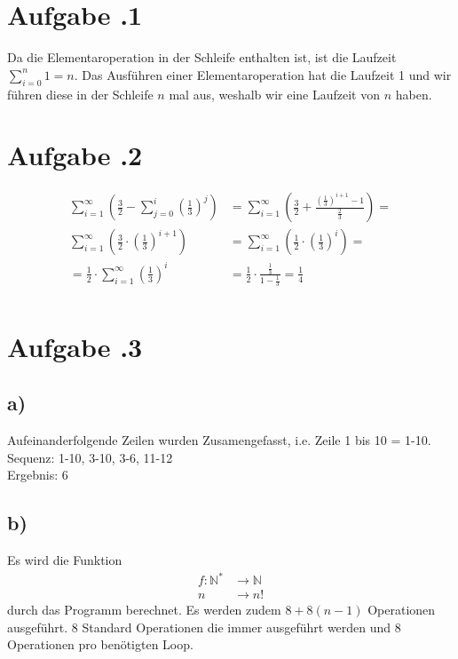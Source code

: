 \documentclass[12pt,german,a4paper]{article}
\author{Giovanni Ngodji Djeuha, Mike Lenz, Jonas Tesfamariam,\\ Bastian Schmitt, Luca Winterkamp}
\begin{document}
	\maketitle

	\section*{Aufgabe \bn.1}
	
	Da die Elementaroperation in der Schleife enthalten ist, ist die Laufzeit $ \sum ^{ n } _{ i=0 } 1=n $. Das Ausführen einer Elementaroperation hat die Laufzeit 1 und wir führen diese in der Schleife $n$ mal aus, weshalb wir eine Laufzeit von $n$ haben.
	\newpage

	\section*{Aufgabe \bn.2}
	\begin{align*}
	\sum ^{ \infty } _{ i=1 } \left( \frac{ 3 }{ 2 } - \sum ^{ i } _{ j=0 }\left(\frac{ 1 }{ 3 } \right) ^{ j } \right) &= \sum ^{ \infty } _{ i=1 } \left( \frac{ 3 }{ 2 } + \frac{ (\frac{ 1 }{ 3 }) ^{ i+1 } -1  }{ \frac{ 2 }{ 3 }  }  \right) = \\
  \sum ^{ \infty } _{ i=1 } \left( \frac{ 3 }{ 2 } \cdot \left( \frac{ 1 }{ 3 } \right)^{ i+1 }  \right) &= \sum ^{ \infty } _{ i=1 } \left( \frac{ 1 }{ 2 } \cdot \left( \frac{ 1 }{ 3 } \right)^{ i }  \right)= \\
	= \frac{ 1 }{ 2 } \cdot \sum ^{ \infty } _{ i=1 } \left( \frac{ 1 }{ 3 } \right)^{ i } &= \frac{ 1 }{ 2 } \cdot \frac{ \frac{ 1 }{ 3 } }{ 1-\frac{ 1 }{ 3 } } = \frac{ 1 }{ 4 }  \\
	\end{align*}
  \newpage

	\section*{Aufgabe \bn.3}
	\subsection*{a)}
	Aufeinanderfolgende Zeilen wurden Zusamengefasst, i.e. Zeile 1 bis 10 = 1-10.\\
	Sequenz: 1-10, 3-10, 3-6, 11-12 \\
	Ergebnis: 6

	\subsection*{b)}
	Es wird die Funktion
	\begin{align*}
	f:\mathbb{N} ^{ * } &\rightarrow \mathbb{N} \\
	n &\rightarrow n!
	\end{align*}
	durch das Programm berechnet. Es werden zudem $8+8(n-1)$ Operationen ausgeführt. 8 Standard Operationen die immer ausgeführt werden und 8 Operationen pro benötigten Loop.
\end{document}
